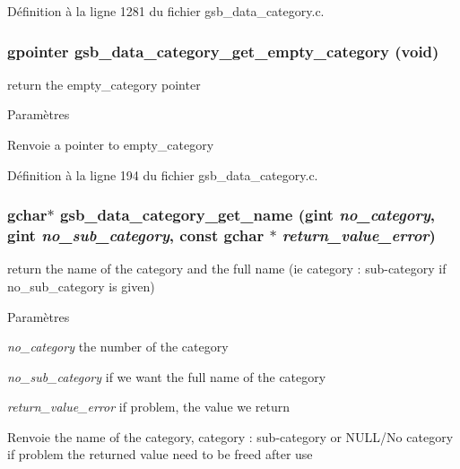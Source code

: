 Définition à la ligne 1281 du fichier gsb\_\-data\_\-category.c.

\subsubsection[{gsb\_\-data\_\-category\_\-get\_\-empty\_\-category}]{\setlength{\rightskip}{0pt plus 5cm}gpointer gsb\_\-data\_\-category\_\-get\_\-empty\_\-category (void)}\label{gsb__data__category_8c_ac519a744a6487c166367b5e12fb3f2b5}
return the empty\_\-category pointer


\begin{DoxyParams}{Paramètres}
\item[{\em }]\end{DoxyParams}
\begin{DoxyReturn}{Renvoie}
a pointer to empty\_\-category 
\end{DoxyReturn}


Définition à la ligne 194 du fichier gsb\_\-data\_\-category.c.

\subsubsection[{gsb\_\-data\_\-category\_\-get\_\-name}]{\setlength{\rightskip}{0pt plus 5cm}gchar$\ast$ gsb\_\-data\_\-category\_\-get\_\-name (gint {\em no\_\-category}, \/  gint {\em no\_\-sub\_\-category}, \/  const gchar $\ast$ {\em return\_\-value\_\-error})}\label{gsb__data__category_8c_a615342249ac310a61000690303ce88a9}
return the name of the category and the full name (ie category : sub-\/category if no\_\-sub\_\-category is given)


\begin{DoxyParams}{Paramètres}
\item[{\em no\_\-category}]the number of the category \item[{\em no\_\-sub\_\-category}]if we want the full name of the category \item[{\em return\_\-value\_\-error}]if problem, the value we return\end{DoxyParams}
\begin{DoxyReturn}{Renvoie}
the name of the category, category : sub-\/category or NULL/No category if problem the returned value need to be freed after use 
\end{DoxyReturn}


